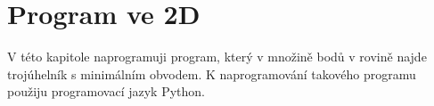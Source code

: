 \chapter{Program ve 2D}
\label{chap:program ve 2D}

V této kapitole naprogramuji program, který v množině bodů v rovině najde trojúhelník s minimálním obvodem. K naprogramování takového programu použiju programovací jazyk Python. 